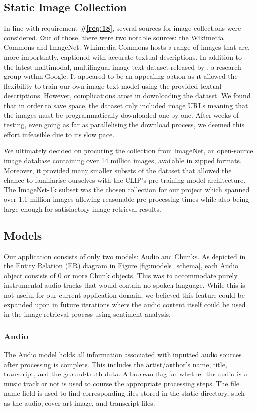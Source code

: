 \documentclass{l4proj}
\begin{document}
\subsection{Static Image Collection}
In line with requirement \textbf{\#\ref{req:18}}, several sources for image collections were considered. Out of those, there were two notable sources: the Wikimedia Commons and ImageNet. Wikimedia Commons hosts a range of images that are, more importantly, captioned with accurate textual descriptions. In addition to the latest multimodal, multilingual image-text dataset released by \cite{srinivasan2021wit}, a research group within Google. It appeared to be an appealing option as it allowed the flexibility to train our own image-text model using the provided textual descriptions. However, complications arose in downloading the dataset. We found that in order to save space, the dataset only included image URLs meaning that the images must be programmatically downloaded one by one. After weeks of testing, even going as far as parallelising the download process, we deemed this effort infeasible due to its slow pace. 

We ultimately decided on procuring the collection from ImageNet, an open-source image database containing over 14 million images, available in zipped formats. Moreover, it provided many smaller subsets of the dataset that allowed the chance to familiarise ourselves with the CLIP's pre-training model architecture. The ImageNet-1k subset was the chosen collection for our project which spanned over 1.1 million images allowing reasonable pre-processing times while also being large enough for satisfactory image retrieval results.


\subsection{Models}
Our application consists of only two models: Audio and Chunks. As depicted in the Entity Relation (ER) diagram in Figure \ref{fig:models_schema}, each Audio object consists of 0 or more Chunk objects. This was to accommodate purely instrumental audio tracks that would contain no spoken language. While this is not useful for our current application domain, we believed this feature could be expanded upon in future iterations where the audio content itself could be used in the image retrieval process using sentiment analysis.

\subsubsection{Audio}
The Audio model holds all information associated with inputted audio sources after processing is complete. This includes the artist/author's name, title, transcript, and the ground-truth data. A boolean flag for whether the audio is a music track or not is used to course the appropriate processing steps. The file name field is used to find corresponding files stored in the static directory, such as the audio, cover art image, and transcript files. 
\end{document}
